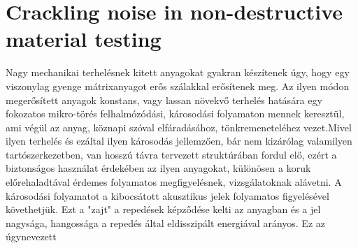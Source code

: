 \chapter{Crackling noise in non-destructive material testing}

Nagy mechanikai terhelésnek kitett anyagokat gyakran készítenek úgy, hogy egy viszonylag gyenge mátrixanyagot erős szálakkal erősítenek meg. 
Az ilyen módon megerősített anyagok konstans, vagy lassan növekvő terhelés hatására egy fokozatos mikro-törés felhalmózódási, károsodási folyamaton mennek keresztül, ami végül
az anyag, köznapi szóval elfáradásához, tönkremeneteléhez vezet.Mivel ilyen terhelés és ezáltal ilyen károsodás jellemzően, bár nem kizárólag valamilyen tartószerkezetben, van hosszú távra tervezett struktúrában fordul elő, ezért a biztonságos használat érdekében az ilyen anyagokat, különösen a koruk előrehaladtával érdemes folyamatos megfigyelésnek, vizsgálatoknak alávetni. 
A károsodási folyamatot a kibocsátott akusztikus jelek folyamatos figyelésével követhetjük. Ezt a "zajt" a repedések képződése kelti az anyagban és a jel nagysága, hangossága a repedés által eldisszipált energiával arányos. Ez az úgynevezett 